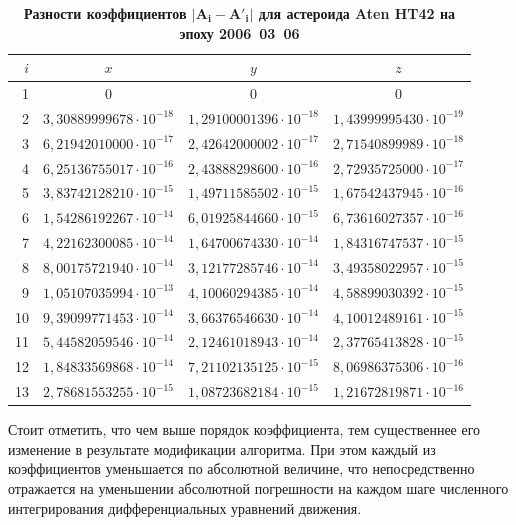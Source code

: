 \begin{table}[p!]
\small \centering
\caption{\bf Разности коэффициентов $\boldsymbol{|A_i-A'_i|}$ для астероида Aten\; HT42 на эпоху 2006~03~06}
\vspace{-3mm}
\begin{tabular}{r|c|c|c}
\hline	
\footnotesize $i$ & \footnotesize 	$x$	&\footnotesize 	$y$	&\footnotesize 	$z$	\\
\hline
\rule{0mm}{12pt}%
1	&$	0	$&$	0	$&$	0	$\\
2	&$	3,30889999678\cdot 10^{-18}	$&$	1,29100001396\cdot 10^{-18}	$&$	1,43999995430\cdot 10^{-19}	 $\\
3	&$	6,21942010000\cdot 10^{-17}	$&$	2,42642000002\cdot 10^{-17}	$&$	2,71540899989\cdot 10^{-18}	 $\\
4	&$	6,25136755017\cdot 10^{-16}	$&$	2,43888298600\cdot 10^{-16}	$&$	2,72935725000\cdot 10^{-17}	 $\\
5	&$	3,83742128210\cdot 10^{-15}	$&$	1,49711585502\cdot 10^{-15}	$&$	1,67542437945\cdot 10^{-16}	 $\\
6	&$	1,54286192267\cdot 10^{-14}	$&$	6,01925844660\cdot 10^{-15}	$&$	6,73616027357\cdot 10^{-16}	 $\\
7	&$	4,22162300085\cdot 10^{-14}	$&$	1,64700674330\cdot 10^{-14}	$&$	1,84316747537\cdot 10^{-15}	 $\\
8	&$	8,00175721940\cdot 10^{-14}	$&$	3,12177285746\cdot 10^{-14}	$&$	3,49358022957\cdot 10^{-15}	 $\\
9	&$	1,05107035994\cdot 10^{-13}	$&$	4,10060294385\cdot 10^{-14}	$&$	4,58899030392\cdot 10^{-15}	 $\\
10	&$	9,39099771453\cdot 10^{-14}	$&$	3,66376546630\cdot 10^{-14}	$&$	4,10012489161\cdot 10^{-15}	$\\
11	&$	5,44582059546\cdot 10^{-14}	$&$	2,12461018943\cdot 10^{-14}	$&$	2,37765413828\cdot 10^{-15}	$\\
12	&$	1,84833569868\cdot 10^{-14}	$&$	7,21102135125\cdot 10^{-15}	$&$	8,06986375306\cdot 10^{-16}	$\\
13	&$	2,78681553255\cdot 10^{-15}	$&$	1,08723682184\cdot 10^{-15}	$&$	1,21672819871\cdot 10^{-16}	$\\
\hline
\end{tabular}
\end{table}

 Стоит отметить, что чем выше порядок коэффициента, тем существеннее его изменение в результате модификации алгоритма. При этом каждый из коэффициентов уменьшается по абсолютной величине, что непосредственно отражается на уменьшении абсолютной погрешности на каждом шаге численного интегрирования дифференциальных уравнений движения.

